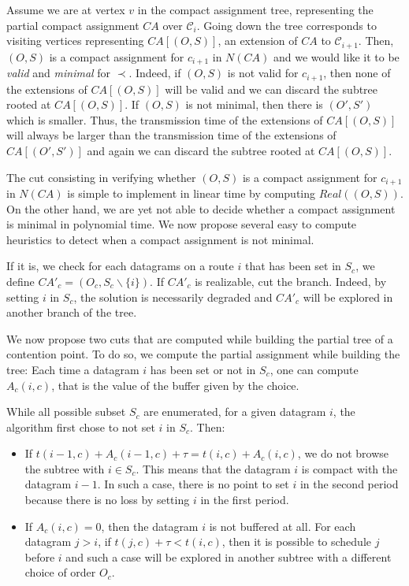 Assume we are at vertex $v$ in the compact assignment tree, representing the partial compact assignment $CA$
over $\mathcal{C}_i$. Going down the tree corresponds to visiting vertices representing $CA[(O,S)]$, an extension of $CA$ to $\mathcal{C}_{i+1}$. Then, $(O,S)$ is a compact assignment for $c_{i+1}$ in $N(CA)$ and we would like it to be \emph{valid} and \emph{minimal} for $\prec$. Indeed, if $(O,S)$ is not valid for $c_{i+1}$, then none of the extensions of $CA[(O,S)]$ will be valid and we can discard the subtree rooted at $CA[(O,S)]$.
 If $(O,S)$ is not minimal, then there is $(O',S')$ which is smaller. Thus, the transmission time of the extensions of $CA[(O,S)]$ will always be larger than the transmission time of the extensions of $CA[(O',S')]$ and again we can discard the subtree rooted at $CA[(O,S)]$.


The cut consisting in verifying whether $(O,S)$ is a compact assignment for $c_{i+1}$ in $N(CA)$ is simple to
implement in linear time by computing $Real((O,S))$. On the other hand, we are yet not able to decide whether a compact assignment is minimal in polynomial time. We now propose several easy to compute heuristics to detect when a compact assignment is not minimal.


If it is, we check for each datagrams on a route $i$ that has been set in $S_{c}$, we define $CA'_c = (O_c,S_c\backslash\{i\})$. If $CA'_c$ is realizable, cut the branch. Indeed, by setting $i$ in $S_c$, the solution is necessarily degraded and $CA'_c$ will be explored in another branch of the tree.


We now propose two cuts that are computed while building the partial tree of a contention point. To do so, we compute the partial assignment while building the tree: Each time a datagram $i$ has been set or not in $S_c$, one can compute $A_{c}(i,c)$, that is the value of the buffer given by the choice.

While all possible subset $S_c$ are enumerated, for a given datagram $i$, the algorithm first chose to not set $i$ in $S_c$. Then:
\begin{itemize}
 \item If $t(i-1,c) + A_{c}(i-1,c) + \tau = t(i,c) + A_{c}(i,c)$, we do not browse the subtree with $i \in S_c$. This means that the datagram $i$ is compact with the datagram $i-1$. In such a case, there is no point to set $i$ in the second period because there is no loss by setting $i$ in the first period.

\item If $A_{c}(i,c) = 0$, then the datagram $i$ is not buffered at all. For each datagram $j>i$, if $t(j,c) + \tau < t(i,c)$, then it is possible to schedule $j$ before $i$ and such a case will be explored in another subtree with a different choice of order $O_c$.

\end{itemize}


